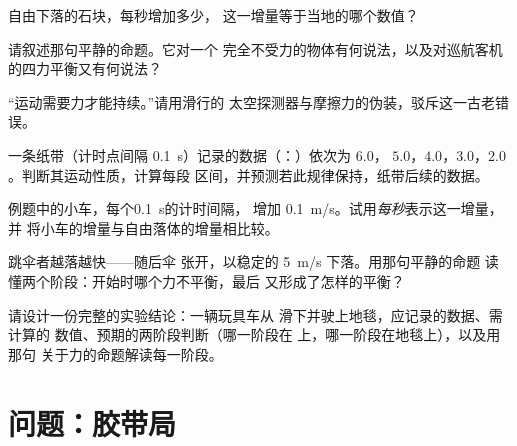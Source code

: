 \begin{exercise}[$\star$]\label{exo:g9:uniform-varied-motion:6}
自由下落的石块，每秒增加多少，
这一增量等于当地的哪个数值？
\end{exercise}

\begin{exercise}[$\star$]\label{exo:g9:uniform-varied-motion:7}
请叙述那句平静的命题。它对一个
完全不受力的物体有何说法，以及对巡航客机
的四力平衡又有何说法？
\end{exercise}

\begin{exercise}[$\star$]\label{exo:g9:uniform-varied-motion:8}
“运动需要力才能持续。”请用滑行的
太空探测器与摩擦力的伪装，驳斥这一古老错误。
%
\end{exercise}

\begin{exercise}[$\star\star$]\label{exo:g9:uniform-varied-motion:9}
一条纸带（计时点间隔 \qty{0.1}{s}）记录的数据（：）依次为 $6.0$，
$5.0$，$4.0$，$3.0$，$2.0$。判断其运动性质，计算每段
区间，并预测若此规律保持，纸带后续的数据。
\end{exercise}

\begin{exercise}[$\star\star$]\label{exo:g9:uniform-varied-motion:10}
例题中的小车，每个\qty{0.1}{s}的计时间隔，
增加 \qty{0.1}{m/s}。试用\emph{每秒}表示这一增量，并
将小车的增量与自由落体的增量相比较。
\end{exercise}

\begin{exercise}[$\star\star$]\label{exo:g9:uniform-varied-motion:11}
跳伞者越落越快——随后伞
张开，以稳定的 \qty{5}{m/s} 下落。用那句平静的命题
读懂两个阶段：开始时哪个力不平衡，最后
又形成了怎样的平衡？
\end{exercise}

\begin{exercise}[$\star\star\star$]\label{exo:g9:uniform-varied-motion:12}
请设计一份完整的实验结论：一辆玩具车从
滑下并驶上地毯，应记录的数据、需计算的
数值、预期的两阶段判断（哪一阶段在
上，哪一阶段在地毯上），以及用那句
关于力的命题解读每一阶段。
\end{exercise}

\section{问题：胶带局}


